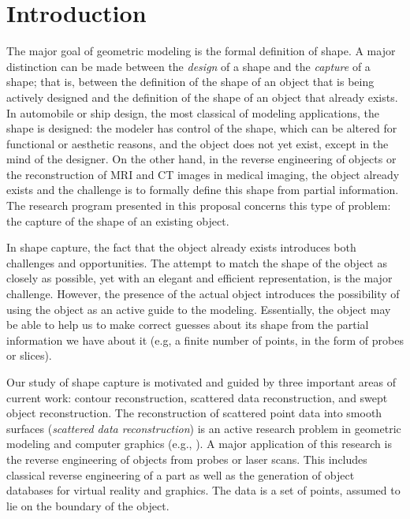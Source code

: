 \begin{abstract}
\ \ 
\end{abstract}


\section{Introduction}

The major goal of geometric modeling is the formal definition of shape.
A major distinction can be made between the {\em design} of a shape
and the {\em capture} of a shape;
that is, between the definition of the shape of an object
that is being actively designed and the definition of the shape of an object 
that already exists.
In automobile or ship design, the most classical of modeling applications, 
the shape is designed:
the modeler has control of the shape, which can be altered for functional
or aesthetic reasons, and the object does not yet exist, except in the
mind of the designer.
On the other hand, in the reverse engineering of objects or the reconstruction
of MRI and CT images in medical imaging, the object already exists
and the challenge is to formally define this shape from partial information.
The research program presented in this proposal concerns this type of problem:
the capture of the shape of an existing object.

In shape capture, the fact that the object already exists introduces
both challenges and opportunities.
The attempt to match the shape of the object as closely as possible,
yet with an elegant and efficient representation, is the major challenge.
However, the presence of the actual object introduces the possibility
of using the object as an active guide to the modeling.
Essentially, the object may be able to help us to make correct guesses
about its shape from the partial information we have about it (e.g, a finite 
number of points, in the form of probes or slices).

Our study of shape capture is motivated and guided by three important
areas of current work: contour reconstruction, scattered data reconstruction, 
and swept object reconstruction.
The reconstruction of scattered point data into smooth surfaces
({\em scattered data reconstruction})
is an active research problem in geometric modeling and computer graphics
(e.g., \cite{Hoppe,MeyersSurvey,Sequin,Seidel}).
A major application of this research is the reverse engineering
of objects from probes or laser scans.
This includes classical reverse engineering of a part as well as
the generation of object databases for virtual reality and graphics.
The data is a set of points, assumed to lie on the boundary of the object.

